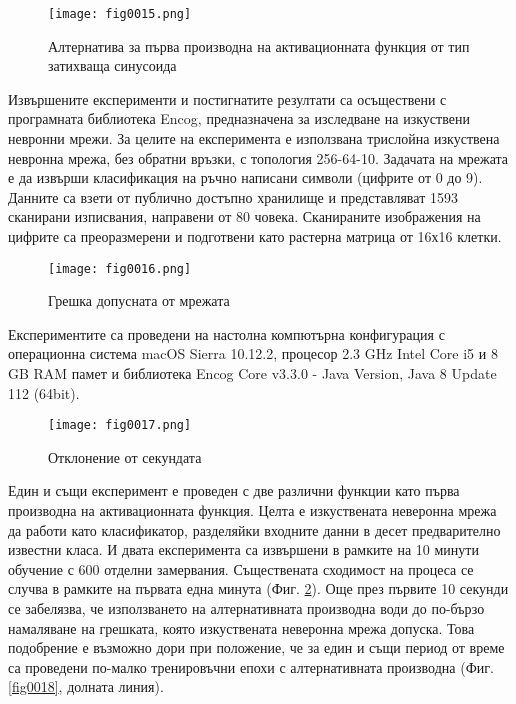 \begin{figure}[H]
  \centering
  \texttt{[image: fig0015.png]}
  \caption{Алтернатива за първа производна на активационната функция от тип затихваща синусоида}
\label{fig0015}
\end{figure}

Извършените експерименти и постигнатите резултати са осъществени с програмната библиотека Encog, предназначена за изследване на изкуствени невронни мрежи. За целите на експеримента е използвана трислойна изкуствена невронна мрежа, без обратни връзки, с топология 256-64-10. Задачата на мрежата е да извърши класификация на ръчно написани символи (цифрите от 0 до 9). Данните са взети от публично достъпно хранилище и представляват 1593 сканирани изписвания, направени от 80 човека. Сканираните изображения на цифрите са преоразмерени и подготвени като растерна матрица от 16х16 клетки.

\begin{figure}[H]
  \centering
  \texttt{[image: fig0016.png]}
  \caption{Грешка допусната от мрежата}
\label{fig0016}
\end{figure}

Експериментите са проведени на настолна компютърна конфигурация с операционна система macOS Sierra 10.12.2, процесор 2.3 GHz Intel Core i5 и 8 GB RAM памет и библиотека Encog Core v3.3.0 - Java Version, Java 8 Update 112 (64bit).

\begin{figure}[H]
  \centering
  \texttt{[image: fig0017.png]}
  \caption{Отклонение от секундата}
\label{fig0017}
\end{figure}

Един и същи експеримент е проведен с две различни функции като първа производна на активационната функция. Целта е изкуствената неверонна мрежа да работи като класификатор, разделяйки входните данни в десет предварително известни класа. И двата експеримента са извършени в рамките на 10 минути обучение с 600 отделни замервания. Съществената сходимост на процеса се случва в рамките на първата една минута (Фиг. \ref{fig0016}). Още през първите 10 секунди се забелязва, че използването на алтернативната производна води до по-бързо намаляване на грешката, която изкуствената неверонна мрежа допуска. Това подобрение е възможно дори при положение, че за един и същи период от време са проведени по-малко тренировъчни епохи с алтернативната производна (Фиг. \ref{fig0018}, долната линия).

